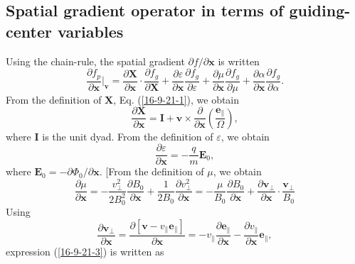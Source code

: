 \documentclass{article}
\newcommand{\nobracket}{}
\newcommand{\tmmathbf}[1]{\ensuremath{\boldsymbol{#1}}}
\begin{document}
\subsection{Spatial gradient operator in terms of guiding-center variables}

Using the chain-rule, the spatial gradient $\partial f / \partial \mathbf{x}$
is written
\begin{equation}
  \label{16-9-17-e1} \frac{\partial f_p}{\partial \mathbf{x}} |_{\mathbf{v}}
  \nobracket = \frac{\partial \mathbf{X}}{\partial \mathbf{x}} \cdot
  \frac{\partial f_g}{\partial \mathbf{X}} + \frac{\partial
  \varepsilon}{\partial \mathbf{x}}  \frac{\partial f_g}{\partial \varepsilon}
  + \frac{\partial \mu}{\partial \mathbf{x}}  \frac{\partial f_g}{\partial
  \mu} + \frac{\partial \alpha}{\partial \mathbf{x}}  \frac{\partial
  f_g}{\partial \alpha} .
\end{equation}
From the definition of $\mathbf{X}$, Eq. (\ref{16-9-21-1}), we obtain
\begin{equation}
  \frac{\partial \mathbf{X}}{\partial \mathbf{x}} =\mathbf{I}+\mathbf{v}
  \times \frac{\partial}{\partial \mathbf{x}} \left(
  \frac{\tmmathbf{e}_{\parallel}}{\Omega} \right),
\end{equation}
where $\mathbf{I}$ is the unit dyad. From the definition of $\varepsilon$, we
obtain
\begin{equation}
  \frac{\partial \varepsilon}{\partial \mathbf{x}} = - \frac{q}{m}
  \mathbf{E}_0,
\end{equation}
where $\mathbf{E}_0 = - \partial \Phi_0 / \partial \mathbf{x}$. [From the
definition of $\mu$, we obtain
\begin{equation}
  \label{16-9-21-3} \frac{\partial \mu}{\partial \mathbf{x}} = -
  \frac{v_{\perp}^2}{2 B^2_0} \frac{\partial B_0}{\partial \mathbf{x}} +
  \frac{1}{2 B_0}  \frac{\partial v_{\perp}^2}{\partial \mathbf{x}} = -
  \frac{\mu}{B_0}  \frac{\partial B_0}{\partial \mathbf{x}} + \frac{\partial
  \mathbf{v}_{\perp}}{\partial \mathbf{x}} \cdot
  \frac{\mathbf{v}_{\perp}}{B_0}
\end{equation}
Using
\begin{equation}
  \frac{\partial \mathbf{v}_{\perp}}{\partial \mathbf{x}} = \frac{\partial
  [\mathbf{v}- v_{\parallel} \mathbf{e}_{\parallel}]}{\partial \mathbf{x}} = -
  v_{\parallel} \frac{\partial \mathbf{e}_{\parallel}}{\partial \mathbf{x}} -
  \frac{\partial v_{\parallel}}{\partial \mathbf{x}} \mathbf{e}_{\parallel},
\end{equation}
expression (\ref{16-9-21-3}) is written as
\end{document}
